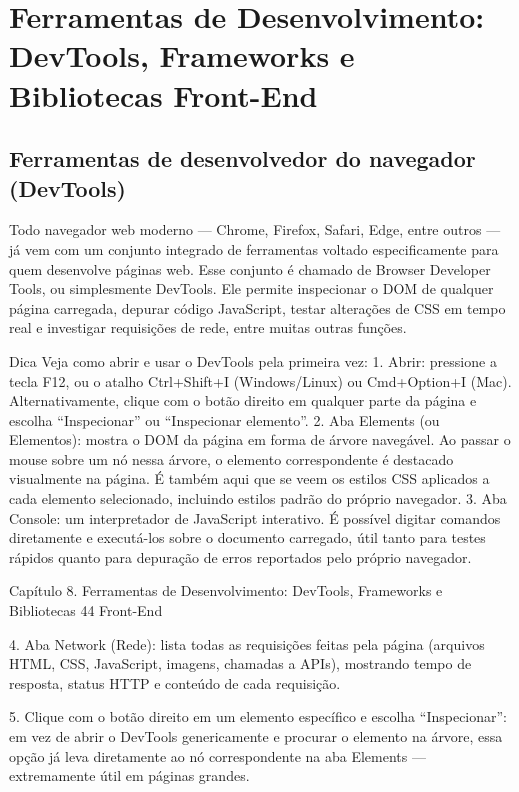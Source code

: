 \chapter{Ferramentas de Desenvolvimento: DevTools, Frameworks e Bibliotecas Front-End}

\section{Ferramentas de desenvolvedor do navegador (DevTools)}

Todo navegador web moderno — Chrome, Firefox, Safari, Edge, entre outros — já vem com um conjunto integrado de ferramentas voltado especificamente para quem desenvolve páginas web. Esse conjunto é chamado de Browser Developer Tools, ou simplesmente DevTools. Ele permite inspecionar o DOM de qualquer página carregada, depurar código JavaScript, testar alterações de CSS em tempo real e investigar requisições de rede, entre muitas outras funções.

\begin{infobox}{Dica}
Veja como abrir e usar o DevTools pela primeira vez: 1. Abrir: pressione a tecla F12, ou o atalho Ctrl+Shift+I (Windows/Linux) ou Cmd+Option+I (Mac). Alternativamente, clique com o botão direito em qualquer parte da página e escolha “Inspecionar” ou “Inspecionar elemento”. 2. Aba Elements (ou Elementos): mostra o DOM da página em forma de árvore navegável. Ao passar o mouse sobre um nó nessa árvore, o elemento correspondente é destacado visualmente na página. É também aqui que se veem os estilos CSS aplicados a cada elemento selecionado, incluindo estilos padrão do próprio navegador. 3. Aba Console: um interpretador de JavaScript interativo. É possível digitar comandos diretamente e executá-los sobre o documento carregado, útil tanto para testes rápidos quanto para depuração de erros reportados pelo próprio navegador.
\end{infobox}

Capítulo 8. Ferramentas de Desenvolvimento: DevTools, Frameworks e Bibliotecas 44 Front-End

4. Aba Network (Rede): lista todas as requisições feitas pela página (arquivos HTML, CSS, JavaScript, imagens, chamadas a APIs), mostrando tempo de resposta, status HTTP e conteúdo de cada requisição.

5. Clique com o botão direito em um elemento específico e escolha “Inspecionar”: em vez de abrir o DevTools genericamente e procurar o elemento na árvore, essa opção já leva diretamente ao nó correspondente na aba Elements — extremamente útil em páginas grandes.

